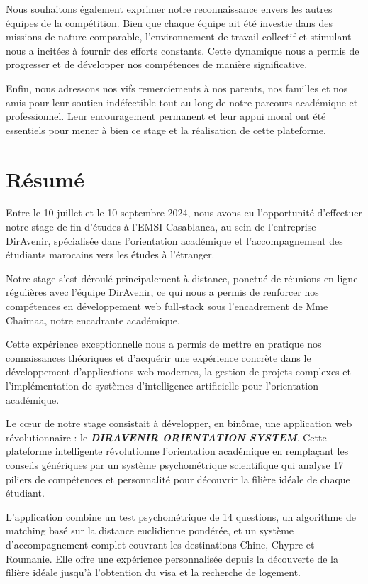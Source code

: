\documentclass[12pt,a4paper]{report}
\begin{document}
Nous souhaitons également exprimer notre reconnaissance envers les autres équipes de la compétition. Bien que chaque équipe ait été investie dans des missions de nature comparable, l'environnement de travail collectif et stimulant nous a incitées à fournir des efforts constants. Cette dynamique nous a permis de progresser et de développer nos compétences de manière significative.

Enfin, nous adressons nos vifs remerciements à nos parents, nos familles et nos amis pour leur soutien indéfectible tout au long de notre parcours académique et professionnel. Leur encouragement permanent et leur appui moral ont été essentiels pour mener à bien ce stage et la réalisation de cette plateforme.

\chapter*{Résumé}

Entre le 10 juillet et le 10 septembre 2024, nous avons eu l'opportunité d'effectuer notre stage de fin d'études à l'EMSI Casablanca, au sein de l'entreprise DirAvenir, spécialisée dans l'orientation académique et l'accompagnement des étudiants marocains vers les études à l'étranger.

Notre stage s'est déroulé principalement à distance, ponctué de réunions en ligne régulières avec l'équipe DirAvenir, ce qui nous a permis de renforcer nos compétences en développement web full-stack sous l'encadrement de Mme Chaimaa, notre encadrante académique.

Cette expérience exceptionnelle nous a permis de mettre en pratique nos connaissances théoriques et d'acquérir une expérience concrète dans le développement d'applications web modernes, la gestion de projets complexes et l'implémentation de systèmes d'intelligence artificielle pour l'orientation académique.

Le cœur de notre stage consistait à développer, en binôme, une application web révolutionnaire : le \textbf{\textit{DIRAVENIR ORIENTATION SYSTEM}}. Cette plateforme intelligente révolutionne l'orientation académique en remplaçant les conseils génériques par un système psychométrique scientifique qui analyse 17 piliers de compétences et personnalité pour découvrir la filière idéale de chaque étudiant.

L'application combine un test psychométrique de 14 questions, un algorithme de matching basé sur la distance euclidienne pondérée, et un système d'accompagnement complet couvrant les destinations Chine, Chypre et Roumanie. Elle offre une expérience personnalisée depuis la découverte de la filière idéale jusqu'à l'obtention du visa et la recherche de logement.
\end{document}
